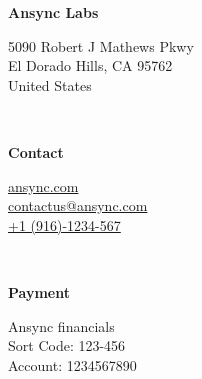 \begin{minipage}[t]{0.3\textwidth}
	\itshape %
	
	\textbf{Ansync Labs} %
	
	5090 Robert J Mathews Pkwy \\ %
	El Dorado Hills, CA 95762 \\
	United States \\
\end{minipage}
\begin{minipage}[t]{0.03\textwidth}
	~ %
\end{minipage}
\begin{minipage}[t]{0.3\textwidth}
	\itshape %
	
	\textbf{Contact}
	
	\href{https://ansync.com}{ansync.com} \\ %
	\href{mailto:contactus@ansync.com}{contactus@ansync.com} \\
	\href{+1(916)-1234-567}{+1 (916)-1234-567}\\
\end{minipage}
\begin{minipage}[t]{0.03\textwidth}
	~ %
\end{minipage}
\begin{minipage}[t]{0.3\textwidth}
	\itshape %
	
	\textbf{Payment}
	
	Ansync financials \\ %
	Sort Code: 123-456 \\
	Account: 1234567890 \\
\end{minipage}



